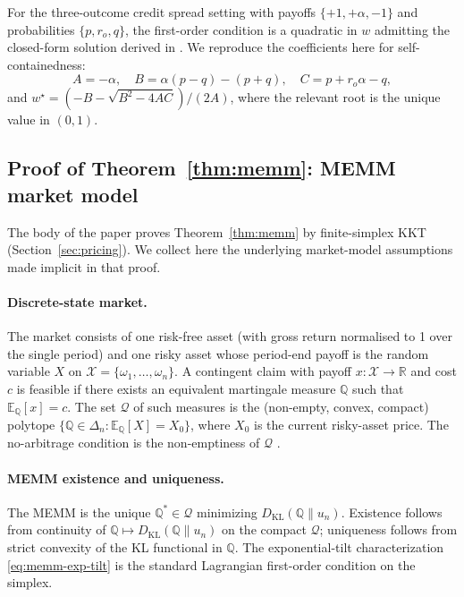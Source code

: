 \documentclass[11pt]{article}
\theoremstyle{definition}
\theoremstyle{remark}
\newcommand{\E}{\mathbb{E}}
\newcommand{\Q}{\mathbb{Q}}
\newcommand{\R}{\mathbb{R}}
\newcommand{\X}{\mathcal{X}}
\newcommand{\KL}{D_{\mathrm{KL}}}
\begin{document}
For the three-outcome credit spread setting with payoffs
$\{+1, +\alpha, -1\}$ and probabilities $\{p, r_o, q\}$, the
first-order condition is a quadratic in $w$ admitting the closed-form
solution derived in \citet[Appendix A]{mercurio2026empirical}. We
reproduce the coefficients here for self-containedness:
\begin{equation*}
A = -\alpha, \quad B = \alpha (p - q) - (p + q), \quad C = p + r_o \alpha - q,
\end{equation*}
and $w^\star = (-B - \sqrt{B^2 - 4AC})/(2A)$, where the relevant root
is the unique value in $(0, 1)$.


\subsection{Proof of Theorem~\ref{thm:memm}: MEMM market model}

The body of the paper proves Theorem~\ref{thm:memm} by finite-simplex
KKT (Section~\ref{sec:pricing}). We collect here the underlying
market-model assumptions made implicit in that proof.

\paragraph{Discrete-state market.} The market consists of one risk-free
asset (with gross return normalised to 1 over the single period) and
one risky asset whose period-end payoff is the random variable $X$ on
$\X = \{\omega_1, \ldots, \omega_n\}$. A contingent claim with payoff
$x: \X \to \R$ and cost $c$ is feasible if there exists an equivalent
martingale measure $\Q$ such that $\E_\Q[x] = c$. The set
$\mathcal{Q}$ of such measures is the (non-empty, convex, compact)
polytope $\{ \Q \in \Delta_n : \E_\Q[X] = X_0\}$, where $X_0$ is the
current risky-asset price. The no-arbitrage condition is the
non-emptiness of $\mathcal{Q}$ \citep{follmer2002}.

\paragraph{MEMM existence and uniqueness.} The MEMM is the unique
$\Q^* \in \mathcal{Q}$ minimizing $\KL(\Q \| u_n)$. Existence follows
from continuity of $\Q \mapsto \KL(\Q \| u_n)$ on the compact
$\mathcal{Q}$; uniqueness follows from strict convexity of the KL
functional in $\Q$. The exponential-tilt characterization
\eqref{eq:memm-exp-tilt} is the standard Lagrangian first-order
condition on the simplex.
\end{document}
